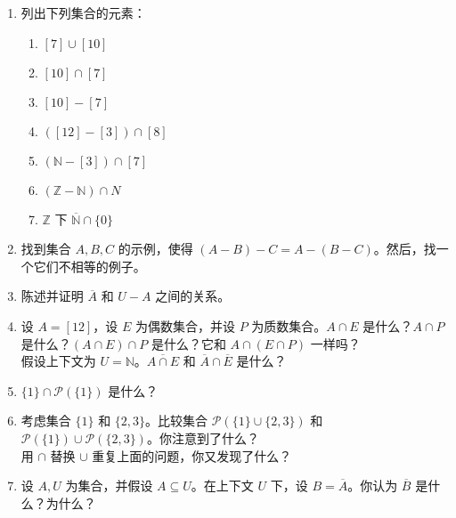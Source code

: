 \begin{enumerate}[label=(\arabic*)]
    \item 列出下列集合的元素：
        \begin{enumerate}[label=(\alph*)]
            \item $[7] \cup [10]$
            \item $[10] \cap [7]$
            \item $[10] - [7]$
            \item $([12] - [3]) \cap [8]$
            \item $(\mathbb{N} - [3]) \cap [7]$
            \item $(\mathbb{Z}-\mathbb{N}) \cap N$
            \item $\mathbb{Z}$ 下 $\overline{\mathbb{N}} \cap \{0\}$
        \end{enumerate}
    \item 找到集合 $A,B,C$ 的示例，使得 $(A - B) - C = A - (B - C)$。然后，找一个它们不相等的例子。
    \item 陈述并证明 $\overline{A}$ 和 $U - A$ 之间的关系。
    \item 设 $A = [12]$，设 $E$ 为偶数集合，并设 $P$ 为质数集合。$A \cap E$ 是什么？$A \cap P$ 是什么？$(A \cap E) \cap P$ 是什么？它和 $A \cap (E \cap P)$ 一样吗？\\
    假设上下文为 $U = \mathbb{N}$。$\overline{A \cap E}$ 和 $\overline{A} \cap \overline{E}$ 是什么？
    \item $ \{1\} \cap \mathcal{P}(\{1\})$ 是什么？
    \item 考虑集合 $\{1\}$ 和 $\{2, 3\}$。比较集合 $\mathcal{P}(\{1\} \cup \{2, 3\})$ 和 $\mathcal{P}(\{1\}) \cup \mathcal{P}(\{2, 3\})$。你注意到了什么？\\
    用 $\cap$ 替换 $\cup$ 重复上面的问题，你又发现了什么？\label{exc:exercises3.5.6}
    \item 设 $A, U$ 为集合，并假设 $A \subseteq U$。在上下文 $U$ 下，设 $B = \overline{A}$。你认为 $\overline{B}$ 是什么？为什么？
\end{enumerate}
